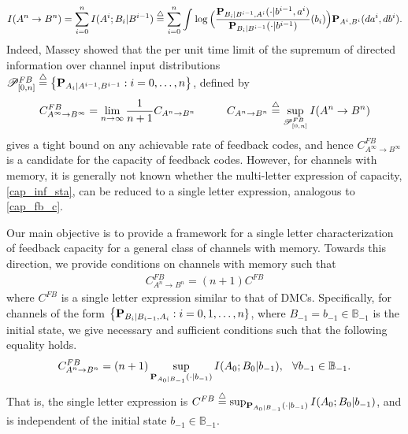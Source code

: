 \documentclass[11pt, a4paper, journal,onecolumn]{IEEEtran}
\newcommand{\sr}{\stackrel}
\newcommand{\rar}{\rightarrow}
\newcommand{\tri}{\sr{\triangle}{=}}
\newcommand{\bea}{\begin{eqnarray}}
\newcommand{\eea}{\end{eqnarray}}
\newcommand{\hso}{\hspace{.1in}}
\begin{document}
\bea
I(A^n\rar B^n)=\sum_{i=0}^n I(A^i;B_i|B^{i-1})\tri \sum_{i=0}^n \int_{  }^{}   \log \Big( \frac{ {\bf P}_{B_i|B^{i-1}, A^i}(\cdot|b^{i-1}, a^i) }{{\bf P}_{B_i|B^{i-1}}(\cdot|b^{i-1})}(b_i)\Big){ \bf P}_{A^i, B^i}( da^i, db^i).
\eea
Indeed, Massey \cite{massey1990} showed that the per unit time limit of the supremum of directed information over channel input distributions ${\cal P}_{[0,n]}^{FB}\tri \big\{{\bf P}_{A_i|A^{i-1}, B^{i-1}}: i=0, \ldots, n\big\}$, defined by 
\bea
C^{FB}_{A^{\infty}\rar B^{\infty}}=\lim_{n\rar\infty}\frac{1}{n+1}C_{A^{n}\rar B^{n}} \hspace{1cm} C_{A^{n}\rar B^{n}}\tri\sup_{{\cal P}_{[0,n]}^{FB}}I(A^n\rar B^n) \label{cap_inf_sta}
\eea
gives a tight bound on any achievable rate of feedback codes, and hence  $C^{FB}_{A^{\infty}\rar B^\infty}$ is a candidate for the capacity of feedback codes. However, for channels with memory, it is generally not known whether the multi-letter  expression of  capacity, \eqref{cap_inf_sta}, can be reduced to a single letter expression, analogous to \eqref{cap_fb_c}.
\par Our main objective is to provide a framework for a single letter characterization of  feedback capacity for a general class of channels with memory. Towards this direction, we provide conditions on channels with memory such that 
\bea
C_{A^n \rar B^n}^{FB}=(n+1)C^{FB} \label{cap_1}
\eea
where $C^{FB}$ is a single letter expression similar to that of DMCs. Specifically, for channels of the form $\big\{{\bf P}_{B_i|B_{i-1}, A_i}: i=0, 1, \ldots, n\}$, where $B_{-1}=b_{-1}\in {\mathbb B}_{-1}$ is the initial state,  we give necessary and sufficient conditions such that the following equality holds.
\bea
C_{A^n \rar B^n}^{FB}=(n+1)\sup_{{\bf P}_{A_0|B_{-1}}(\cdot|b_{-1})}I(A_0;B_0|b_{-1}), \hso \forall b_{-1}\in {\mathbb B}_{-1}. \label{cap_1sa}
\eea
That is, the single letter expression is $C^{FB}\tri \sup_{{\bf P}_{A_0|B_{-1}}(\cdot|b_{-1})}I(A_0;B_0|b_{-1})$, and  is independent of the initial state $b_{-1} \in {\mathbb B}_{-1}$.
\end{document}
